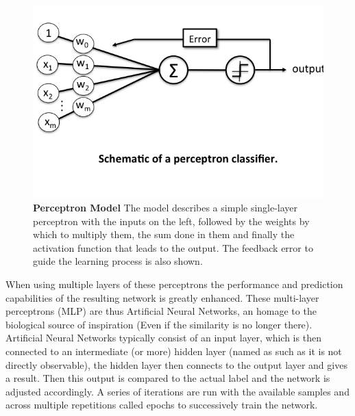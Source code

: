 \begin{figure}[!ht]
	\centerline{\includegraphics[width=5in]{images/background/perceptron.png}}
	\caption{{\bf Perceptron Model\cite{percep}}
		The model describes a simple single-layer perceptron with the inputs on the left, followed by the weights by which to multiply them, the sum done in them and finally the activation function that leads to the output. The feedback error to guide the learning process is also shown.} 
	\label{percep1}
\end{figure}
When using multiple layers of these perceptrons the performance and prediction capabilities of the resulting network is greatly enhanced. These multi-layer perceptrons (MLP) are thus Artificial Neural Networks, an homage to the biological source of inspiration (Even if the similarity is no longer there). Artificial Neural Networks typically consist of an input layer, which is then connected to an intermediate (or more) hidden layer (named as such as it is not directly observable), the hidden layer then connects to the output layer and gives a result. Then this output is compared to the actual label and the network is adjusted accordingly. A series of iterations are run with the available samples and across multiple repetitions called epochs to successively train the network.

